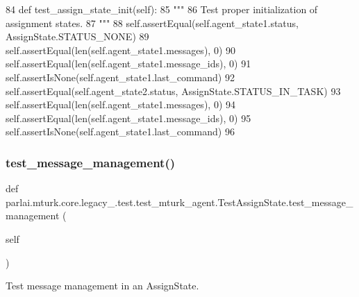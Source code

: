 \begin{DoxyCode}
84     \textcolor{keyword}{def }test\_assign\_state\_init(self):
85         \textcolor{stringliteral}{"""}
86 \textcolor{stringliteral}{        Test proper initialization of assignment states.}
87 \textcolor{stringliteral}{        """}
88         self.assertEqual(self.agent\_state1.status, AssignState.STATUS\_NONE)
89         self.assertEqual(len(self.agent\_state1.messages), 0)
90         self.assertEqual(len(self.agent\_state1.message\_ids), 0)
91         self.assertIsNone(self.agent\_state1.last\_command)
92         self.assertEqual(self.agent\_state2.status, AssignState.STATUS\_IN\_TASK)
93         self.assertEqual(len(self.agent\_state1.messages), 0)
94         self.assertEqual(len(self.agent\_state1.message\_ids), 0)
95         self.assertIsNone(self.agent\_state1.last\_command)
96 
\end{DoxyCode}
\mbox{\label{classparlai_1_1mturk_1_1core_1_1legacy__2018_1_1test_1_1test__mturk__agent_1_1TestAssignState_a04eb6ae8f6cd58e5f09094d5e5b97d0b}} 
\subsubsection{\texorpdfstring{test\+\_\+message\+\_\+management()}{test\_message\_management()}}
{\footnotesize\ttfamily def parlai.\+mturk.\+core.\+legacy\+\_.\+test.\+test\+\_\+mturk\+\_\+agent.\+Test\+Assign\+State.\+test\+\_\+message\+\_\+management (\begin{DoxyParamCaption}\item[{}]{self }\end{DoxyParamCaption})}

\begin{DoxyVerb}Test message management in an AssignState.
\end{DoxyVerb}
 

